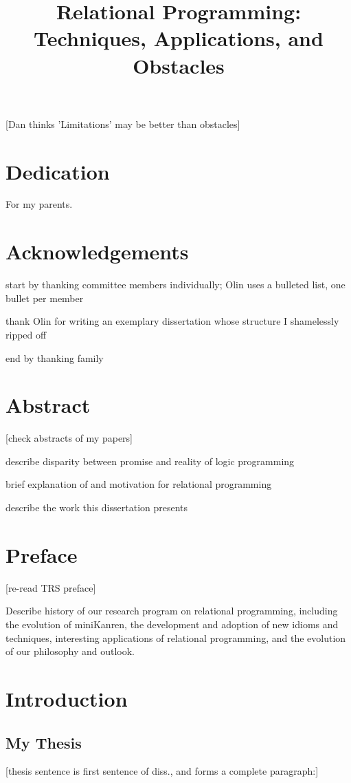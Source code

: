 \title{Relational Programming: Techniques, Applications, and Obstacles}

[Dan thinks 'Limitations' may be better than obstacles]

\chapter{Dedication} For my parents.

\chapter{Acknowledgements}

start by thanking committee members individually; Olin uses a bulleted
list, one bullet per member

thank Olin for writing an exemplary dissertation whose structure I
shamelessly ripped off

end by thanking family

\chapter{Abstract}
[check abstracts of my papers]

describe disparity between promise and reality of logic programming

brief explanation of and motivation for relational programming

describe the work this dissertation presents

\chapter{Preface}
[re-read TRS preface]

Describe history of our research program on relational programming,
including the evolution of miniKanren, the development and adoption of
new idioms and techniques, interesting applications of relational
programming, and the evolution of our philosophy and outlook.

\chapter{Introduction}

  \section{My Thesis}

[thesis sentence is first sentence of diss., and forms a complete paragraph:]

